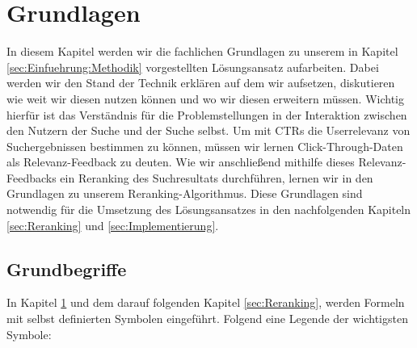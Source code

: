 %
\chapter{Grundlagen}
\label{sec:Grundlagen}

In diesem Kapitel werden wir die fachlichen Grundlagen zu unserem in Kapitel \ref{sec:Einfuehrung:Methodik} vorgestellten Lösungsansatz aufarbeiten. Dabei werden wir den Stand der Technik erklären auf dem wir aufsetzen, diskutieren wie weit wir diesen nutzen können und wo wir diesen erweitern müssen. Wichtig hierfür ist das Verständnis für die Problemstellungen in der Interaktion zwischen den Nutzern der Suche und der Suche selbst. Um mit CTRs die Userrelevanz von Suchergebnissen bestimmen zu können, müssen wir lernen Click-Through-Daten als Relevanz-Feedback zu deuten. Wie wir anschließend mithilfe dieses Relevanz-Feedbacks ein Reranking des Suchresultats durchführen, lernen wir in den Grundlagen zu unserem Reranking-Algorithmus. Diese Grundlagen sind notwendig für die Umsetzung des Lösungsansatzes in den nachfolgenden Kapiteln \ref{sec:Reranking} und \ref{sec:Implementierung}. 


\section{Grundbegriffe}
\label{sec:Grundlagen:Grundbegriffe}

In Kapitel \ref{sec:Grundlagen} und dem darauf folgenden Kapitel \ref{sec:Reranking}, werden Formeln mit selbst definierten Symbolen eingeführt. Folgend eine Legende der wichtigsten Symbole:

